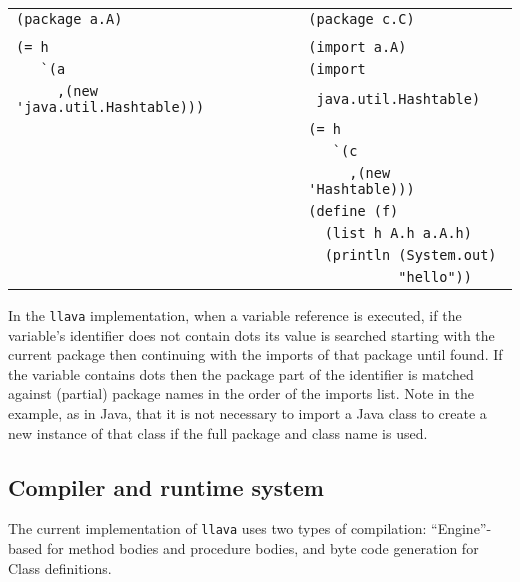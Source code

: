 \documentclass{acm-final/sig-alternate-modified}
\begin{document}
\scriptsize
\begin{tabular}{l|l}
\verb+(package a.A)+                                   & \verb+(package c.C)+ \\
                                                       &                     \\
\verb+(= h+                                            & \verb+(import a.A)+ \\
\verb+   `(a+                                          & \verb+(import+ \\
\verb+     ,(new 'java.util.Hashtable)))+              & \verb+ java.util.Hashtable)+ \\
                                                       & \verb+(= h+ \\
                                                       & \verb+   `(c+ \\
                                                       & \verb+     ,(new 'Hashtable)))+ \\
                                                       & \verb+(define (f)+ \\
                                                       & \verb+  (list h A.h a.A.h)+ \\
                                                       & \verb+  (println (System.out)+ \\
                                                       & \verb+           "hello"))+ \\
\end{tabular}
\normalsize

In the {\tt llava} implementation, when a variable reference is
executed, if the variable's identifier does not contain dots its value
is searched starting with the current package then continuing with the
imports of that package until found.  If the variable contains dots
then the package part of the identifier is matched against (partial)
package names in the order of the imports list.  Note in the example,
as in Java, that it is not necessary to import a Java class to create
a new instance of that class if the full package and class name is
used.


\subsection{Compiler and runtime system}

The current implementation of {\tt llava} uses two types of
compilation: ``Engine''-based for method bodies and procedure bodies,
and byte code generation for Class definitions.
\end{document}
